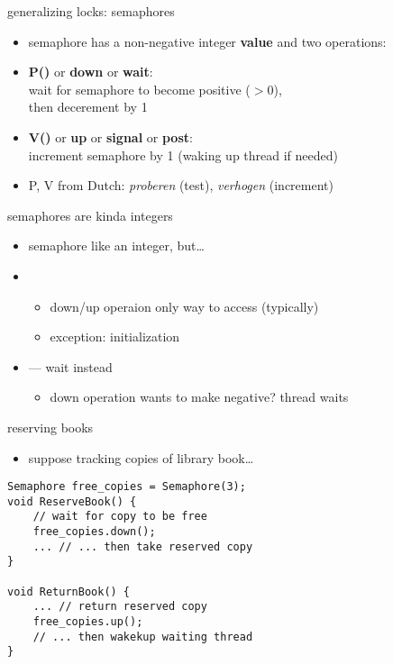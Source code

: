 \usetikzlibrary{arrows.meta,fit,matrix,shapes.misc}

\begin{frame}{generalizing locks: semaphores}
\begin{itemize}
\item semaphore has a non-negative integer \textbf{value} and two operations:
\item \textbf{P()} or \textbf{down} or \textbf{wait}:  \\
wait for semaphore to become positive ($>0$), \\ then decerement by 1
\item \textbf{V()} or \textbf{up} or \textbf{signal} or \textbf{post}: \\
increment semaphore by 1 (waking up thread if needed)
\vspace{1cm}
\item {\small P, V from Dutch: \textit{proberen} (test), \textit{verhogen} (increment)}
\end{itemize}
\end{frame}

\begin{frame}{semaphores are kinda integers}
\begin{itemize}
\item semaphore like an integer, but\ldots
\item {}
    \begin{itemize}
    \item down/up operaion only way to access (typically)
    \item exception: initialization
    \end{itemize}
\item {} --- wait instead
    \begin{itemize}
    \item down operation wants to make negative? thread waits
    \end{itemize}
\end{itemize}
\end{frame}

\begin{frame}[fragile,label=reserveBooks]{reserving books}
\begin{itemize}
\item suppose tracking copies of library book\ldots
\end{itemize}
\begin{lstlisting}
Semaphore free_copies = Semaphore(3);
void ReserveBook() {
    // wait for copy to be free
    free_copies.down();
    ... // ... then take reserved copy
}

void ReturnBook() {
    ... // return reserved copy
    free_copies.up();
    // ... then wakekup waiting thread
}
\end{lstlisting}
\end{frame}

